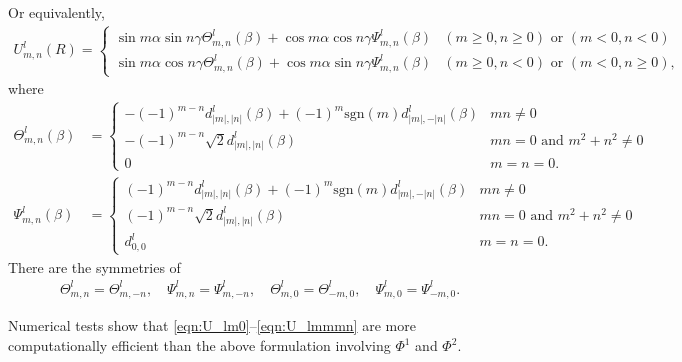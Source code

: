 \documentclass[onecolumn,11pt]{IEEEtran}
\begin{document}
Or equivalently,
\begin{align*}
    U^l_{m,n} (R) =
    \begin{cases}
        \sin m\alpha \sin n\gamma \Theta^l_{m,n} (\beta) + \cos m\alpha \cos n\gamma \Psi^l_{m,n}(\beta) & (m\geq 0, n\geq 0) \text{ or } (m<0,n<0)\\
        \sin m\alpha \cos n\gamma \Theta^l_{m,n} (\beta) + \cos m\alpha \sin n\gamma \Psi^l_{m,n}(\beta) & (m\geq 0, n < 0) \text{ or } (m<0,n\geq0),
    \end{cases}
\end{align*}
where
\begin{align*}
    \Theta^l_{m,n}(\beta) & =
    \begin{cases}
        -(-1)^{m-n} d^l_{|m|,|n|}(\beta) + (-1)^m\mathrm{sgn}(m) d^l_{|m|,-|n|}(\beta) & mn\neq 0\\
        -(-1)^{m-n} \sqrt{2} d^l_{|m|,|n|}(\beta) & mn = 0 \text{ and } m^2+n^2 \neq 0\\
        0 & m=n=0.
    \end{cases}\\
    \Psi^l_{m,n}(\beta) & = 
    \begin{cases}
        (-1)^{m-n} d^l_{|m|,|n|}(\beta) + (-1)^m\mathrm{sgn}(m) d^l_{|m|,-|n|}(\beta) & mn\neq 0\\
        (-1)^{m-n} \sqrt{2} d^l_{|m|,|n|}(\beta) & mn = 0 \text{ and } m^2+n^2 \neq 0\\
        d^l_{0,0} & m=n=0.
    \end{cases}
\end{align*}
There are the symmetries of
\begin{align*}
    \Theta^l_{m,n}=\Theta^l_{m,-n},\quad
    \Psi^l_{m,n}=\Psi^l_{m,-n},\quad
    \Theta^l_{m,0}=\Theta^l_{-m,0},\quad
    \Psi^l_{m,0}=\Psi^l_{-m,0}.
\end{align*}



Numerical tests show that \eqref{eqn:U_lm0}--\eqref{eqn:U_lmmmn} are more computationally efficient than the above formulation involving $\Phi^1$ and $\Phi^2$. 
\end{document}
